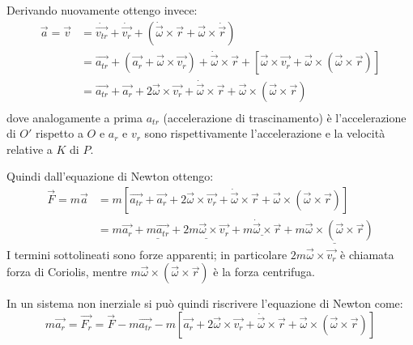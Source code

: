 \documentclass[main.tex]{subfiles}
\begin{document}
Derivando nuovamente ottengo invece:
\begin{equation}\label{AccNonInerziale}
\begin{split}
	\overrightarrow{a}=\overrightarrow{v}	& =\dot{\overrightarrow{v_{tr}}}+\dot{\overrightarrow{v_r}}+\left(\dot{\overrightarrow{\omega}}\times\overrightarrow{r}+\overrightarrow{\omega}\times\dot{\overrightarrow{r}}\right)\\
											& =\overrightarrow{a_{tr}}+\left(\overrightarrow{a_r}+\overrightarrow{\omega}\times\overrightarrow{v_r}\right)+\dot{\overrightarrow{\omega}}\times\overrightarrow{r}+\left[\overrightarrow{\omega}\times\overrightarrow{v_r}+\overrightarrow{\omega}\times(\overrightarrow{\omega}\times\overrightarrow{r})\right]\\
											& =\overrightarrow{a_{tr}}+\overrightarrow{a_r}+2\overrightarrow{\omega}\times\overrightarrow{v_r}+\dot{\overrightarrow{\omega}}\times\overrightarrow{r}+\overrightarrow{\omega}\times(\overrightarrow{\omega}\times\overrightarrow{r})\\
\end{split}
\end{equation}
dove analogamente a prima $a_{tr}$ (accelerazione di trascinamento) è l'accelerazione di $O'$ rispetto a $O$ e $a_r$ e 
$v_r$ sono rispettivamente l'accelerazione e la velocità relative a $K$ di $P$.

Quindi dall'equazione di Newton ottengo:
\begin{equation*}
\begin{split}
	\overrightarrow{F}=m\overrightarrow{a}	& =m\left[\overrightarrow{a_{tr}}+\overrightarrow{a_r}+2\overrightarrow{\omega}\times\overrightarrow{v_r}+\dot{\overrightarrow{\omega}}\times\overrightarrow{r}+\overrightarrow{\omega}\times(\overrightarrow{\omega}\times\overrightarrow{r})\right]\\
											& =m\overrightarrow{a_r}+\underline{m\overrightarrow{a_{tr}}}+\underline{2m\overrightarrow{\omega}\times\overrightarrow{v_r}}+\underline{m\dot{\overrightarrow{\omega}}\times\overrightarrow{r}}+\underline{m\overrightarrow{\omega}\times(\overrightarrow{\omega}\times\overrightarrow{r})}
\end{split}
\end{equation*}
I termini sottolineati sono forze apparenti; in particolare $2m\overrightarrow{\omega}\times\overrightarrow{v_r}$
è chiamata forza di Coriolis, mentre $m\overrightarrow{\omega}\times(\overrightarrow{\omega}\times\overrightarrow{r})$
è la forza centrifuga.

In un sistema non inerziale si può quindi riscrivere l'equazione di Newton come:
\begin{equation}\label{ForzaNonInerziale}
	m\overrightarrow{a_r}=\overrightarrow{F_r}=\overrightarrow{F}-m\overrightarrow{a_{tr}}-m\left[\overrightarrow{a_r}+2\overrightarrow{\omega}\times\overrightarrow{v_r}+\dot{\overrightarrow{\omega}}\times\overrightarrow{r}+\overrightarrow{\omega}\times(\overrightarrow{\omega}\times\overrightarrow{r})\right]
\end{equation}
\end{document}
